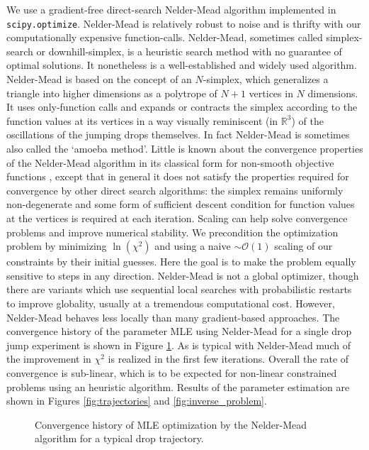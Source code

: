 \documentclass[12pt,a4paper,oneside]{book}
\begin{document}
We use a gradient-free direct-search Nelder-Mead \cite{nelder_simplex_1965} algorithm implemented in \verb|scipy.optimize|. Nelder-Mead is relatively robust to noise and is thrifty with our computationally expensive function-calls. Nelder-Mead, sometimes called simplex-search or downhill-simplex, is a heuristic search method with no guarantee of optimal solutions. It nonetheless is a well-established and widely used algorithm. Nelder-Mead is based on the concept of an $N$-simplex, which generalizes a triangle into higher dimensions as a polytrope of $N + 1$ vertices in $N$ dimensions. It uses only-function calls and expands or contracts the simplex according to the function values at its vertices in a way visually reminiscent (in $\mathbb{R}^3$) of the oscillations of the jumping drops themselves. In fact Nelder-Mead is sometimes also called the `amoeba method'. Little is known about the convergence properties of the Nelder-Mead algorithm in its classical form for non-smooth objective functions \cite{price_convergent_2002}, except that in general it does not satisfy the properties required for convergence by other direct search algorithms: the simplex remains uniformly non-degenerate and some form of sufficient descent condition for function values at the vertices is required at each iteration. Scaling can help solve convergence problems and improve numerical stability. We precondition the optimization problem by minimizing $\ln(\chi^2)$ and using a naive $\sim \mathcal{O}(1)$ scaling of our constraints by their initial guesses. Here the goal is to make the problem equally sensitive to steps in any direction. Nelder-Mead is not a global optimizer, though there are variants which use sequential local searches with probabilistic restarts to improve globality, usually at a tremendous computational cost. However, Nelder-Mead behaves less locally than many gradient-based approaches. The convergence history of the parameter MLE using Nelder-Mead for a single drop jump experiment is shown in Figure \ref{fig:convergence}. As is typical with Nelder-Mead much of the improvement in $\chi^2$ is realized in the first few iterations. Overall the rate of convergence is sub-linear, which is to be expected for non-linear constrained problems using an heuristic algorithm. Results of the parameter estimation are shown in Figures \ref{fig:trajectories} and \ref{fig:inverse_problem}.

\begin{figure}[h]
    \centering
    
    \caption{Convergence history of MLE optimization by the Nelder-Mead algorithm for a typical drop trajectory. \label{fig:convergence}}
\end{figure}
\end{document}
